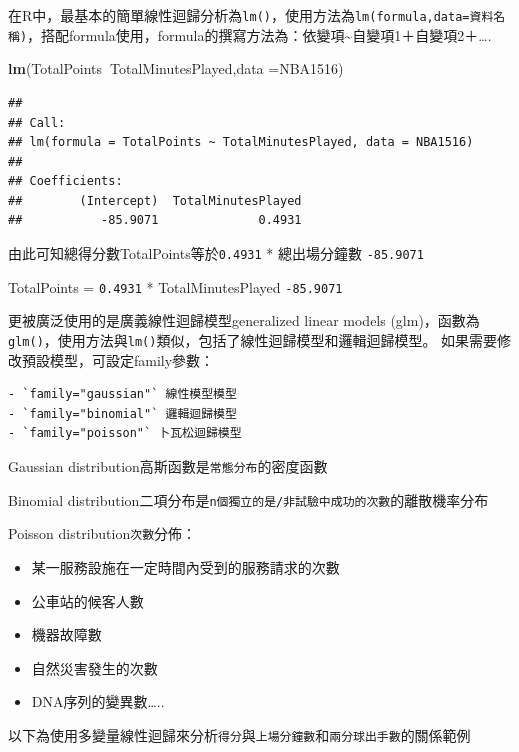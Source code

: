 \documentclass[
]{book}
\newenvironment{Shaded}{\begin{snugshade}}{\end{snugshade}}
\newcommand{\DataTypeTok}[1]{\textcolor[rgb]{0.13,0.29,0.53}{#1}}
\newcommand{\KeywordTok}[1]{\textcolor[rgb]{0.13,0.29,0.53}{\textbf{#1}}}
\newcommand{\NormalTok}[1]{#1}
\newcommand{\OperatorTok}[1]{\textcolor[rgb]{0.81,0.36,0.00}{\textbf{#1}}}
\providecommand{\tightlist}{%
  \setlength{\itemsep}{0pt}\setlength{\parskip}{0pt}}
\begin{document}
在R中，最基本的簡單線性迴歸分析為\texttt{lm()}，使用方法為\texttt{lm(formula,data=資料名稱)}，搭配formula使用，formula的撰寫方法為：依變項\textasciitilde 自變項1＋自變項2＋\ldots.

\begin{Shaded}
\begin{Highlighting}[]
\KeywordTok{lm}\NormalTok{(TotalPoints}\OperatorTok{~}\NormalTok{TotalMinutesPlayed,}\DataTypeTok{data =}\NormalTok{NBA1516)}
\end{Highlighting}
\end{Shaded}

\begin{verbatim}
## 
## Call:
## lm(formula = TotalPoints ~ TotalMinutesPlayed, data = NBA1516)
## 
## Coefficients:
##        (Intercept)  TotalMinutesPlayed  
##           -85.9071              0.4931
\end{verbatim}

由此可知總得分數TotalPoints等於\texttt{0.4931} * 總出場分鐘數 \texttt{-85.9071}

TotalPoints = \texttt{0.4931} * TotalMinutesPlayed \texttt{-85.9071}

更被廣泛使用的是廣義線性迴歸模型generalized linear models (glm)，函數為\texttt{glm()}，使用方法與\texttt{lm()}類似，包括了線性迴歸模型和邏輯迴歸模型。
如果需要修改預設模型，可設定family參數：

\begin{verbatim}
- `family="gaussian"` 線性模型模型
- `family="binomial"` 邏輯迴歸模型
- `family="poisson"` 卜瓦松迴歸模型
\end{verbatim}

Gaussian distribution高斯函數是\texttt{常態分布}的密度函數

Binomial distribution二項分布是\texttt{n個獨立的是/非試驗中成功的次數}的離散機率分布

Poisson distribution\texttt{次數}分佈：

\begin{itemize}
\tightlist
\item
  某一服務設施在一定時間內受到的服務請求的次數
\item
  公車站的候客人數
\item
  機器故障數
\item
  自然災害發生的次數
\item
  DNA序列的變異數\ldots..
\end{itemize}

以下為使用多變量線性迴歸來分析\texttt{得分}與\texttt{上場分鐘數}和\texttt{兩分球出手數}的關係範例
\end{document}

